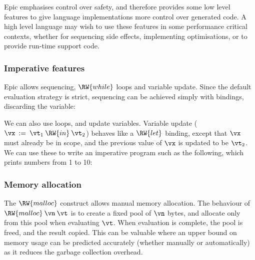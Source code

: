 Epic emphasises control over safety, and therefore provides some low
level features to give language implementations more control over
generated code.  A high level language may wish to use these features
in some performance critical contexts, whether for sequencing side
effects, implementing optimisations, or to provide run-time support
code.

\subsubsection*{Imperative features}

Epic allows sequencing, $\RW{while}$ loops and variable update. Since
the default evaluation strategy is strict, sequencing can be achieved
simply with  bindings, discarding the variable:


\noindent
We can also use  loops, and update variables. Variable
update ($\vx\: :=\:\vt_1\:\RW{in}\:\vt_2$) behaves like a $\RW{let}$
binding, except that $\vx$ must already be in scope, and the previous
value of $\vx$ is updated to be $\vt_2$. We can use these to write an
imperative program such as the following, which prints numbers from 1
to 10:


\subsubsection*{Memory allocation}

The $\RW{malloc}$ construct allows manual memory allocation. The
behaviour of $\RW{malloc}\:\vn\:\vt$ is to create a fixed pool of
$\vn$ bytes, and allocate only from this pool when evaluating
$\vt$. When evaluation is complete, the pool is freed, and the result
copied. This can be valuable where an upper bound on memory usage can
be predicted accurately (whether manually or automatically) as it
reduces the garbage collection overhead.

